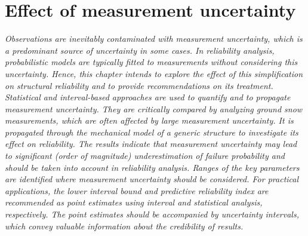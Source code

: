 \chapter{Effect of measurement uncertainty}
\label{cha:error}
\ifpdf
    \graphicspath{{Chapter4/Figs/Raster/}{Chapter4/Figs/PDF/}{Chapter4/Figs/}}
\else
    \graphicspath{{Chapter4/Figs/Vector/}{Chapter4/Figs/}}
\fi

\leftskip=1cm
\noindent
\emph{Observations are inevitably contaminated with measurement uncertainty, which is a predominant source of uncertainty in some cases. In reliability analysis, probabilistic models are typically fitted to measurements without considering this uncertainty. Hence, this chapter intends to explore the effect of this simplification on structural reliability and to provide recommendations on its treatment. Statistical and interval-based approaches are used to quantify and to propagate measurement uncertainty. They are critically compared by analyzing ground snow measurements, which are often affected by large measurement uncertainty. It is propagated through the mechanical model of a generic structure to investigate its effect on reliability. 
The results indicate that measurement uncertainty may lead to significant (order of magnitude) underestimation of failure probability and should be taken into account in reliability analysis. 
Ranges of the key parameters are identified where measurement uncertainty should be considered. For practical applications, the lower interval bound and predictive reliability index are recommended as point estimates using interval and statistical analysis, respectively. The point estimates should be accompanied by uncertainty intervals, which convey valuable information about the credibility of results. 
}

